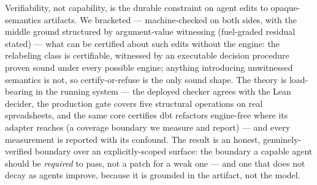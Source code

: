 \documentclass[
  11pt,
]{article}
\begin{document}
Verifiability, not capability, is the durable constraint on agent edits
to opaque-semantics artifacts. We bracketed --- machine-checked on both
sides, with the middle ground structured by argument-value witnessing
(fuel-graded residual stated) --- what can be certified about such edits
without the engine: the relabeling class is certifiable, witnessed by an
executable decision procedure proven sound under every possible engine;
anything introducing unwitnessed semantics is not, so certify-or-refuse
is the only sound shape. The theory is load-bearing in the running
system --- the deployed checker agrees with the Lean decider, the
production gate covers five structural operations on real spreadsheets,
and the same core certifies dbt refactors engine-free where its adapter
reaches (a coverage boundary we measure and report) --- and every
measurement is reported with its confound. The result is an honest,
genuinely-verified boundary over an explicitly-scoped surface: the
boundary a capable agent should be \emph{required} to pass, not a patch
for a weak one --- and one that does not decay as agents improve,
because it is grounded in the artifact, not the model.
\end{document}
